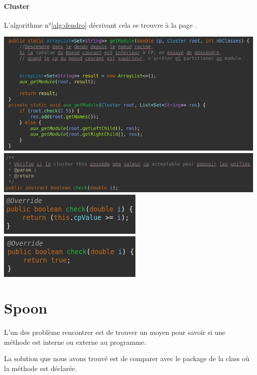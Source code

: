 \documentclass[a4paper]{article}
\begin{document}
\begin{multicols}{2}
        \paragraph{Cluster} L'algorithme n°\ref{alg:dendro} décrivant cela se trouvre à la page \pageref{alg:dendro}.

        \noindent\includegraphics[width=.46\textwidth]{module/code}
        \noindent\includegraphics[width=.46\textwidth]{module/check}
        \noindent\includegraphics[width=.46\textwidth]{module/checkNode}
        \noindent\includegraphics[width=.46\textwidth]{module/checkLeaf}
        \section{Spoon}
        \paragraph{} L'un des problème rencontrer est de trouver un moyen pour savoir si une méthode est interne ou externe au programme.

        La solution que nous avons trouvé est de comparer avec le package de la class où la méthode est déclarée.


\end{multicols}
\end{document}
